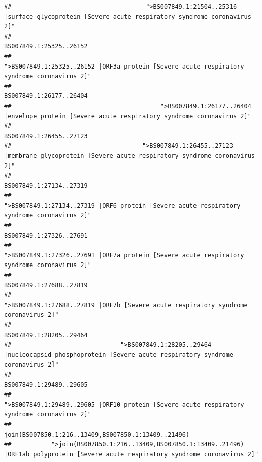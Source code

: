 \documentclass[
]{article}
\begin{document}
\begin{verbatim}
##                                     ">BS007849.1:21504..25316 |surface glycoprotein [Severe acute respiratory syndrome coronavirus 2]" 
##                                                                                                                BS007849.1:25325..26152 
##                                            ">BS007849.1:25325..26152 |ORF3a protein [Severe acute respiratory syndrome coronavirus 2]" 
##                                                                                                                BS007849.1:26177..26404 
##                                         ">BS007849.1:26177..26404 |envelope protein [Severe acute respiratory syndrome coronavirus 2]" 
##                                                                                                                BS007849.1:26455..27123 
##                                    ">BS007849.1:26455..27123 |membrane glycoprotein [Severe acute respiratory syndrome coronavirus 2]" 
##                                                                                                                BS007849.1:27134..27319 
##                                             ">BS007849.1:27134..27319 |ORF6 protein [Severe acute respiratory syndrome coronavirus 2]" 
##                                                                                                                BS007849.1:27326..27691 
##                                            ">BS007849.1:27326..27691 |ORF7a protein [Severe acute respiratory syndrome coronavirus 2]" 
##                                                                                                                BS007849.1:27688..27819 
##                                                    ">BS007849.1:27688..27819 |ORF7b [Severe acute respiratory syndrome coronavirus 2]" 
##                                                                                                                BS007849.1:28205..29464 
##                              ">BS007849.1:28205..29464 |nucleocapsid phosphoprotein [Severe acute respiratory syndrome coronavirus 2]" 
##                                                                                                                BS007849.1:29489..29605 
##                                            ">BS007849.1:29489..29605 |ORF10 protein [Severe acute respiratory syndrome coronavirus 2]" 
##                                                                                    join(BS007850.1:216..13409,BS007850.1:13409..21496) 
##           ">join(BS007850.1:216..13409,BS007850.1:13409..21496) |ORF1ab polyprotein [Severe acute respiratory syndrome coronavirus 2]" 

\end{verbatim}
\end{document}
